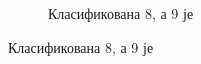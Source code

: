 \begin{figure}[htb!]
\begin{subfigure}{.3\textwidth}
\caption{Класификована 8, а 9 је}\label{pic:goodClass9}
\end{subfigure}
\end{figure}












